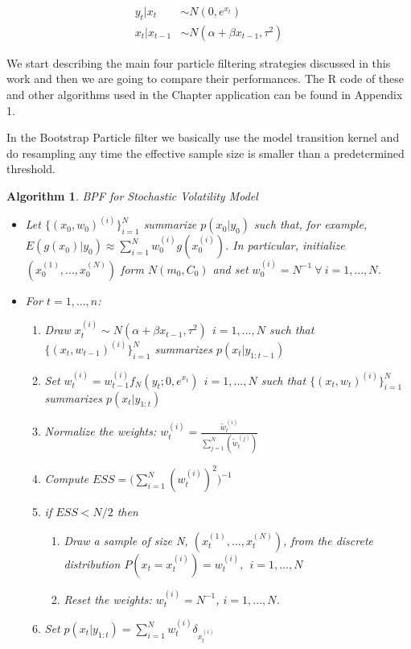 \documentclass[
]{book}
\theoremstyle{break}
\theoremstyle{nonumberplain}
\newtheorem{algorithm}{Algorithm}[section]
\begin{document}
\begin{align}
y_{t}|x_{t} & \sim N(0,e^{x_{t}}) \\
x_{t}|x_{t-1} & \sim N(\alpha+\beta x_{t-1},\tau^2)
\end{align}

We start describing the main four particle filtering strategies
discussed in this work and then we are going to compare their
performances. The R code of these and other algorithms used in the
Chapter application can be found in Appendix 1.

In the Bootstrap Particle filter we basically use the model transition
kernel and do resampling any time the effective sample size is smaller
than a predetermined threshold.

\begin{algorithm} BPF for Stochastic Volatility Model
\begin{itemize}
\item Let $\{(x_{0},w_{0})^{(i)}\}_{i=1}^{N}$ summarize $p(x_{0}|y_{0})$ such that, for example, $E(g(x_{0})|y_{0}) \approx \sum_{i=1}^{N}w_{0}^{(i)}g(x_{0}^{(i)})$. In particular, initialize $(x_{0}^{(1)},...,x_{0}^{(N)})$ form $N(m_{0},C_{0})$ and set $w_{0}^{(i)}=N^{-1} \ \forall \ i=1,...,N$.
\item For $t=1,...,n$:
\begin{enumerate}
\item Draw $x_{t}^{(i)} \sim N(\alpha+\beta x_{t-1},\tau^2) \ \ i=1,...,N$ such that $\{(x_{t},w_{t-1})^{(i)}\}_{i=1}^{N}$ summarizes $p(x_{t}|y_{1:t-1})$
\item Set $w_{t}^{(i)} = w_{t-1}^{(i)}f_{N}(y_{t};0,e^{x_{t}}) \ \ i=1,...,N$ such that $\{(x_{t},w_{t})^{(i)}\}_{i=1}^{N}$ summarizes $p(x_{t}|y_{1:t})$
\item Normalize the weights: $w_{t}^{(i)}=\frac{\tilde{w}_{t}^{(i)}}{\sum_{j=1}^{N}(\tilde{w}_{t}^{(j)})}$
\item Compute $ESS=\Bigg(\sum_{i=1}^{N}(w_{t}^{(i)})^{2}\Bigg)^{-1}$
\item if $ESS<N/2$ then
\begin{enumerate}
\item Draw a sample of size N, $(x_{t}^{(1)},...,x_{t}^{(N)})$, from the discrete distribution $P(x_{t}=x_{t}^{(i)})=w_{t}^{(i)},\ \ i=1,...,N$
\item Reset the weights: $w_{t}^{(i)}=N^{-1}$, $i=1,...,N$.
\end{enumerate}
\item Set $p(x_{t}|y_{1:t})=\sum_{i=1}^{N}w_{t}^{(i)}\delta_{x_{t}^{(i)}}$
\end{enumerate}
\end{itemize}
\end{algorithm}
\end{document}

